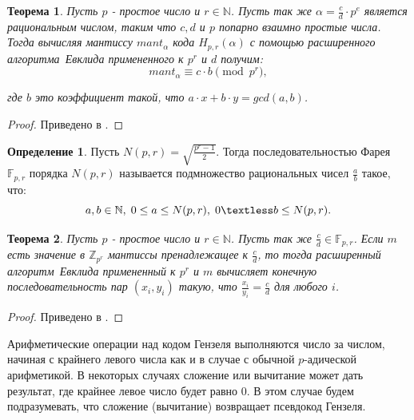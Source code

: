 \documentclass[master, och, diploma, times]{sty/SCWorks}
\theoremstyle{plain}
\newtheorem{thethm}{Теорема}[section]
\theoremstyle{definition}
\newtheorem{defn}{Определение}[section]
\begin{document}
\begin{thethm}\label{th:forward_mapping}
Пусть $p$ - простое число и $r \in \mathbb{N}$. Пусть так же $\alpha=\frac{c}{d} \cdot p^e$ является рациональным числом, таким что $c, d$ и $p$ попарно взаимно простые числа. Тогда вычисляя мантиссу $mant_{\alpha}$ кода $H_{p,r}(\alpha)$ с помощью \mbox{расширенного} \mbox{алгоритма Евклида} примененного к $p^r$ и $d$ получим:
\begin{equation}
mant_{\alpha} \equiv c \cdot b \pmod {p^r},
\end{equation}

\noindent где $b$ это коэффициент такой, что $a\cdot x+b\cdot y = gcd(a,b)$.
\end{thethm}


\begin{proof} 
Приведено в \cite{bib:numbers:miola}.
\end{proof}


\begin{defn}\label{def:farey}
Пусть $N(p, r)=\sqrt{\frac{p^r-1}{2}}$. Тогда последовательностью Фарея $\mathbb{F}_{p,r}$ порядка $N(p, r)$ называется подмножество рациональных чисел $\frac{a}{b}$ такое, что:
\begin{equation}
a, b \in \mathbb{N}, \; 0 \leq a \leq N(p, r), \; 0 \textless b \leq N(p, r).
\end{equation}
\end{defn}


\begin{thethm}\label{th:backward_mapping}
Пусть $p$ - простое число и $r \in \mathbb{N}$. Пусть так же $\frac{c}{d} \in \mathbb{F}_{p,r}$. Если $m$ есть значение в $\mathbb{Z}_{p^r}$ мантиссы пренадлежащее к $\frac{c}{d}$, то тогда \mbox{расширенный} \mbox{алгоритм Евклида} примененный к $p^r$ и $m$ вычисляет конечную последовательность пар $(x_i, y_i)$ такую, что $\frac{x_i}{y_i}=\frac{c}{d}$ для любого $i$.
\end{thethm}

\begin{proof} 
Приведено в \cite{bib:numbers:miola}.
\end{proof}


Арифметические операции над кодом Гензеля выполняются число за числом, начиная с крайнего левого числа как и в случае с обычной $p$-адической арифметикой. В некоторых случаях сложение или вычитание может дать результат, где крайнее левое число будет равно $0$. В этом случае будем подразумевать, что сложение (вычитание) возвращает псевдокод Гензеля.
\end{document}
